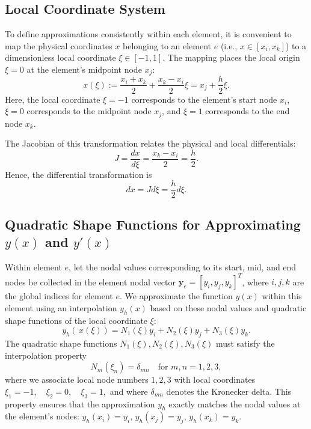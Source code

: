 \documentclass[12pt]{article}
\begin{document}
    
\subsection{Local Coordinate System}
    
    To define approximations consistently within each element, it is convenient to map the physical coordinates \( x \) belonging to an element \(e\) (i.e., \(x \in [x_i, x_k]\)) to a dimensionless local coordinate \( \xi \in \left[-1,1\right] \). The mapping places the local origin \( \xi = 0 \) at the element's midpoint node \( x_j \):
    \[
        x(\xi) := \frac{x_{i} + x_k}{2} + \frac{x_k - x_{i}}{2} \xi =  x_j + \frac{h}{2} \xi.
    \]
    Here, the local coordinate \( \xi = -1 \) corresponds to the element's start node \( x_{i} \), \( \xi = 0 \) corresponds to the midpoint node \( x_j \), and \( \xi = 1 \) corresponds to the end node \( x_k \).
    
    The Jacobian of this transformation relates the physical and local differentials:
    \[ J = \frac{dx}{d\xi} = \frac{x_k - x_i}{2} = \frac{h}{2}. \]
    Hence, the differential transformation is
    \[
        dx = J d\xi = \frac{h}{2} d\xi.
    \]
    
    
    \subsection{Quadratic Shape Functions for Approximating \( y(x) \) and \( y'(x) \) }
    
    Within element \(e\), let the nodal values corresponding to its start, mid, and end nodes be collected in the element nodal vector \( \mathbf{y}_{e} = \left[y_{i}, y_{j}, y_k\right]^{T}\), where \(i, j, k\) are the global indices for element \(e\). We approximate the function \( y(x) \) within this element using an interpolation \( y_h (x) \) based on these nodal values and quadratic shape functions of the local coordinate \( \xi \):
    \[
        y_h \left(\,x(\xi) \right) =  N_{1}(\xi) y_{i} + N_{2}(\xi) y_{j} + N_{3}(\xi) y_k.
    \]
    The quadratic shape functions \( N_1(\xi), N_2(\xi), N_3(\xi) \) must satisfy the interpolation property
    \[
        N_m(\xi_n) = \delta_{mn} \quad \text{for } m, n = 1, 2, 3,
    \]
    where we associate local node numbers $1, 2, 3$ with local coordinates
    \( \xi_1 = -1, \quad \xi_2 = 0, \quad \xi_3 = 1, \)
    and where \(\delta_{mn}\) denotes the Kronecker delta. This property ensures that the approximation \(y_h\) exactly matches the nodal values at the element's nodes: \( y_h(x_i) = y_i\), \( y_h(x_j) = y_j\), \( y_h(x_k) = y_k \).
    
\end{document}
